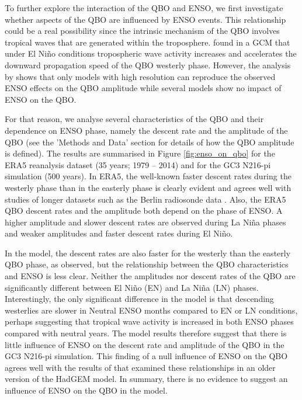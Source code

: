 To further explore the interaction of the QBO and ENSO, we first investigate whether aspects of the QBO are influenced by ENSO events. This relationship could be a real possibility since the intrinsic mechanism of the QBO involves tropical waves that are generated within the troposphere. \cite{schirber2015} found in a GCM that under El Niño conditions tropospheric wave activity increases and accelerates the downward propagation speed of the QBO westerly phase. However, the analysis by \cite{serva2020} shows that only models with high resolution can reproduce the observed ENSO effects on the QBO amplitude while several models show no impact of ENSO on the QBO.

For that reason, we analyse several characteristics of the QBO and their dependence on ENSO phase, namely the descent rate and the amplitude of the QBO (see the 'Methods and Data' section for details of how the QBO amplitude is defined). The results are summarised in Figure \ref{fig:enso_on_qbo} for the ERA5 reanalysis dataset (35 years; 1979 – 2014) and for the GC3 N216-pi simulation (500 years).  
In ERA5, the well-known faster descent rates during the westerly phase than in the easterly phase is clearly evident and agrees well with studies of longer datasets such as the Berlin radiosonde data \citep{schenzinger2017}. Also, the ERA5 QBO descent rates and the amplitude both depend on the phase of ENSO. A higher amplitude and slower descent rates are observed during La Niña phases and weaker amplitudes and faster descent rates during El Niño. 

In the model, the descent rates are also faster for the westerly than the easterly QBO phase, as observed, but the relationship between the QBO characteristics and ENSO is less clear. Neither the amplitudes nor descent rates of the QBO are significantly different between El Niño (EN) and La Niña (LN) phases. Interestingly, the only significant difference in the model is that descending westerlies are slower in Neutral ENSO months compared to EN or LN conditions, perhaps suggesting that tropical wave activity is increased in both ENSO phases compared with neutral years.  The model results therefore suggest that there is little influence of ENSO  on the descent rate and amplitude of the QBO in the GC3 N216-pi simulation. This finding of a null influence of ENSO on the QBO  agrees well with the results of \cite{serva2020} that examined these relationships in an older version of the HadGEM model. In summary, there is no evidence to suggest an influence of ENSO on the QBO in the model. 

